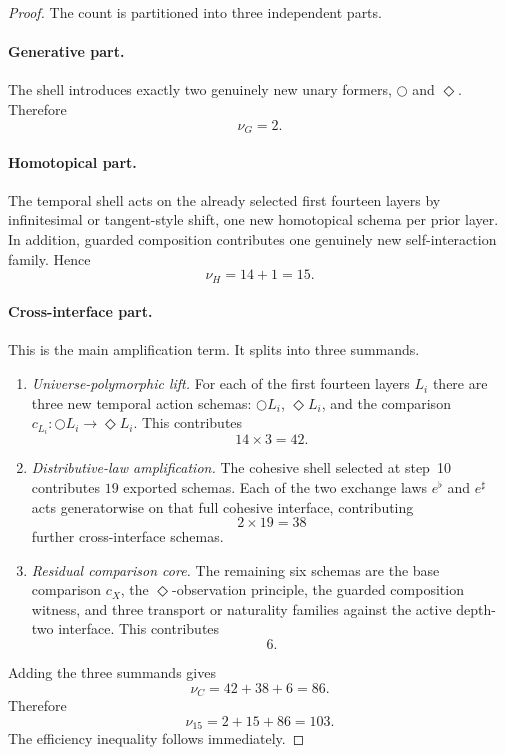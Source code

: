 \documentclass[11pt]{article}
\theoremstyle{plain}
\theoremstyle{definition}
\theoremstyle{remark}
\begin{document}
\begin{proof}
The count is partitioned into three independent parts.

\paragraph{Generative part.}
The shell introduces exactly two genuinely new unary formers, $\bigcirc$ and $\Diamond$. Therefore
\[
  \nu_G=2.
\]

\paragraph{Homotopical part.}
The temporal shell acts on the already selected first fourteen layers by infinitesimal or tangent-style shift, one new homotopical schema per prior layer. In addition, guarded composition contributes one genuinely new self-interaction family. Hence
\[
  \nu_H = 14+1 = 15.
\]

\paragraph{Cross-interface part.}
This is the main amplification term. It splits into three summands.
\begin{enumerate}
    \item \emph{Universe-polymorphic lift.} For each of the first fourteen layers $L_i$ there are three new temporal action schemas: $\bigcirc L_i$, $\Diamond L_i$, and the comparison $c_{L_i}:\bigcirc L_i\to\Diamond L_i$. This contributes
    \[
      14\times 3 = 42.
    \]
    \item \emph{Distributive-law amplification.} The cohesive shell selected at step~10 contributes $19$ exported schemas. Each of the two exchange laws $e^\flat$ and $e^\sharp$ acts generatorwise on that full cohesive interface, contributing
    \[
      2\times 19 = 38
    \]
    further cross-interface schemas.
    \item \emph{Residual comparison core.} The remaining six schemas are the base comparison $c_X$, the $\Diamond$-observation principle, the guarded composition witness, and three transport or naturality families against the active depth-two interface. This contributes
    \[
      6.
    \]
\end{enumerate}
Adding the three summands gives
\[
  \nu_C = 42+38+6 = 86.
\]
Therefore
\[
  \nu_{15}=2+15+86=103.
\]
The efficiency inequality follows immediately.
\end{proof}
\end{document}
